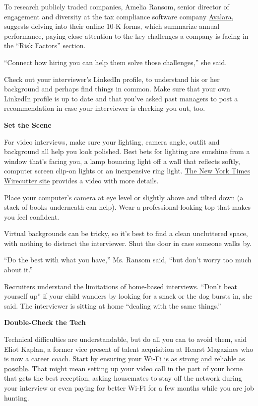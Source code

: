 To research publicly traded companies, Amelia Ransom, senior director of
engagement and diversity at the tax compliance software company
\href{https://www.avalara.com/us/en/index.html}{Avalara}, suggests
delving into their online 10-K forms, which summarize annual
performance, paying close attention to the key challenges a company is
facing in the ``Risk Factors'' section.

``Connect how hiring you can help them solve those challenges,'' she
said.

Check out your interviewer's LinkedIn profile, to understand his or her
background and perhaps find things in common. Make sure that your own
LinkedIn profile is up to date and that you've asked past managers to
post a recommendation in case your interviewer is checking you out, too.

\textbf{Set the Scene}

For video interviews, make sure your lighting, camera angle, outfit and
background all help you look polished. Best bets for lighting are
sunshine from a window that's facing you, a lamp bouncing light off a
wall that reflects softly, computer screen clip-on lights or an
inexpensive ring light.
\href{https://www.nytimes.com/wirecutter/blog/video-call-lighting-tips/}{The
New York Times Wirecutter site} provides a video with more details.

Place your computer's camera at eye level or slightly above and tilted
down (a stack of books underneath can help). Wear a professional-looking
top that makes you feel confident.

Virtual backgrounds can be tricky, so it's best to find a clean
uncluttered space, with nothing to distract the interviewer. Shut the
door in case someone walks by.

``Do the best with what you have,'' Ms. Ransom said, ``but don't worry
too much about it.''

Recruiters understand the limitations of home-based interviews. ``Don't
beat yourself up'' if your child wanders by looking for a snack or the
dog bursts in, she said. The interviewer is sitting at home ``dealing
with the same things.''

\textbf{Double-Check the Tech}

Technical difficulties are understandable, but do all you can to avoid
them, said Eliot Kaplan, a former vice present of talent acquisition at
Hearst Magazines who is now a career coach. Start by ensuring your
\href{https://www.nytimes.com/wirecutter/blog/make-wi-fi-suck-less-working-from-home/}{Wi-Fi
is as strong and reliable as possible}. That might mean setting up your
video call in the part of your home that gets the best reception, asking
housemates to stay off the network during your interview or even paying
for better Wi-Fi for a few months while you are job hunting.

